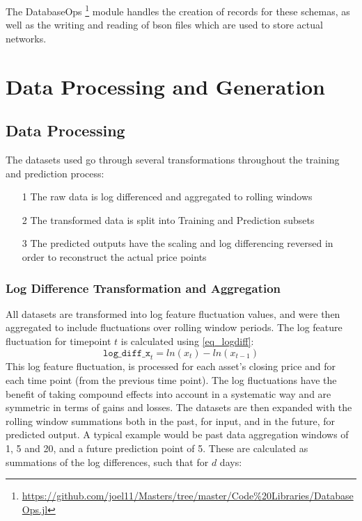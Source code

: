 \documentclass[a4paper,11pt,oneside]{article}
\theoremstyle{plain}
\theoremstyle{definition}
\begin{document}
\newline The DatabaseOps \footnote{\url{https://github.com/joel11/Masters/tree/master/Code\%20Libraries/DatabaseOps.jl}} module handles the creation of records for these schemas, as well as the writing and reading of bson files which are used to store actual networks.

\newpage
\section{Data Processing and Generation }\label{Data}
\subsection{Data Processing}\label{data_processing}

The datasets used go through several transformations throughout the training and prediction process:

\begin{itemize}
	\item [1] The raw data is log differenced and aggregated to rolling windows
	\item [2] The transformed data is split into Training and Prediction subsets
	\item [3] The predicted outputs have the scaling and log differencing reversed in order to reconstruct the actual price points
\end{itemize}

\subsubsection{Log Difference Transformation and Aggregation}\label{ldata_og_difference}
All datasets are transformed into log feature fluctuation values, and were then aggregated to include fluctuations over rolling window periods. The log feature fluctuation for timepoint $t$ is calculated using \eqref{eq_logdiff}:
\begin{equation}\label{eq_logdiff}
\texttt{log\_diff\_x}_t = ln(x_t) - ln(x_{t-1})
\end{equation}
This log feature fluctuation,  is processed for each asset's closing price and for each time point (from the previous time point). The log fluctuations have the benefit of taking compound effects into account in a systematic way and are symmetric in terms of gains and losses.
\newline\newline
The datasets are then expanded with the rolling window summations both in the past, for input, and in the future, for predicted output. A typical example would be past data aggregation windows of 1, 5 and 20, and a future prediction point of 5. These are calculated as summations of the log differences, such that for $d$ days:
\end{document}
